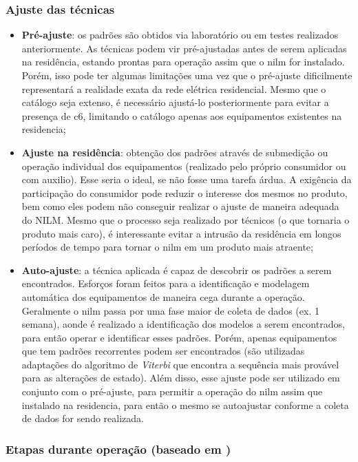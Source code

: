 \subsubsection{Ajuste das técnicas}
\label{top:ajuste_das_tecnicas}

\begin{itemize}
\item \textbf{Pré-ajuste}: os padrões são obtidos via laboratório ou
em testes realizados anteriormente. As técnicas podem vir
pré-ajustadas antes de serem aplicadas na residência, estando prontas
para operação assim que o \acs{nilm} for instalado. Porém, isso pode
ter algumas limitações uma vez que o pré-ajuste dificilmente
representará a realidade exata da rede elétrica residencial. Mesmo que
o catálogo seja extenso, é necessário ajustá-lo posteriormente para
evitar a presença de \acs{c6}, limitando o catálogo apenas aos
equipamentos existentes na residencia;
\item \textbf{Ajuste na residência}: obtenção dos padrões através de
submedição ou operação individual dos equipamentos (realizado pelo
próprio consumidor ou com auxilio). Esse seria o ideal, se não fosse
uma tarefa árdua. A exigência da participação do consumidor pode
reduzir o interesse dos mesmos no produto, bem como eles podem não
conseguir realizar o ajuste de maneira adequada do NILM.
Mesmo que o processo seja realizado por técnicos (o que tornaria o
produto mais caro), é interessante evitar a intrusão
da residência em longos períodos de tempo para tornar o \acs{nilm}
em um produto mais atraente;
\item \textbf{Auto-ajuste}: a técnica aplicada é capaz de descobrir os
padrões a serem encontrados. Esforços foram feitos para a
identificação e modelagem automática dos equipamentos de maneira cega
durante a operação. Geralmente o \acs{nilm} passa por uma fase maior de
coleta de dados (ex. 1 semana), aonde é realizado a identificação dos
modelos a serem encontrados, para então operar e identificar esses
padrões. Porém, apenas equipamentos que tem padrões recorrentes podem
ser encontrados (são utilizadas adaptações do algoritmo de
\emph{Viterbi} que encontra a sequência mais provável para as
alterações de estado). Além disso, esse ajuste pode ser utilizado em
conjunto com o pré-ajuste, para permitir a operação do \acs{nilm}
assim que instalado na residencia, para então o mesmo se autoajustar
conforme a coleta de dados for sendo realizada.
\end{itemize}

\subsubsection[Etapas durante operação]{Etapas durante operação
(baseado em \cite{nilm_matthews_overview_2008_22})}
\label{top:etapas}

